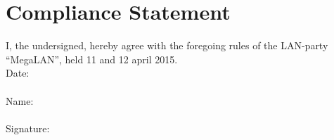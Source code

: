 \documentclass{article}
\begin{document}
\section{Compliance Statement}
I, the undersigned, hereby agree with the foregoing rules of the LAN-party 
``MegaLAN'', held 11 and 12 april 2015.
\\
Date:\\
\\
Name:\\
\\
Signature:\\
\end{document}
